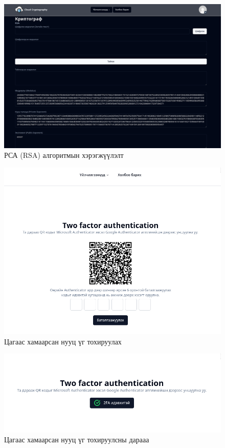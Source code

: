 \begin{figure}[h]
	\centering
	\includegraphics[scale=0.35]{assets/web/rsa.png}
	\caption{РСА (RSA) алгоритмын хэрэгжүүлэлт}
	\label{fig:architecture}
\end{figure}

\begin{figure}[h]
	\centering
	\includegraphics[scale=0.55]{assets/web/2fa.png}
	\caption{Цагаас хамаарсан нууц үг тохируулах}
	\label{fig:architecture}
\end{figure}
\begin{figure}[h]
	\centering
	\includegraphics[scale=0.65]{assets/web/2faconfirm.png}
	\caption{Цагаас хамаарсан нууц үг тохируулсны дарааа}
	\label{fig:architecture}
\end{figure}